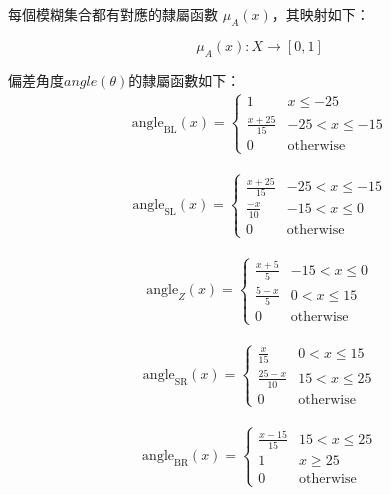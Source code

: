 \documentclass[12pt]{article}       %
\begin{document}
每個模糊集合都有對應的隸屬函數 $\mu_A(x)$，其映射如下：

\begin{equation}
    \mu_A(x) : X \rightarrow [0, 1]
\end{equation}


偏差角度$angle(\theta)$的隸屬函數如下：
\begin{align}
    \text{angle}_{\text{BL}}(x) = 
    \begin{cases}
    1 & x \le -25 \\
    \frac{x + 25}{15} & -25 < x \le -15 \\
    0 & \text{otherwise}
    \end{cases}    
\end{align}

\begin{align}
    \text{angle}_{\text{SL}}(x) = 
    \begin{cases}
    \frac{x + 25}{15} & -25 < x \le -15 \\
    \frac{-x}{10} & -15 < x \le 0 \\
    0 & \text{otherwise}
    \end{cases}    
\end{align}

\begin{align}
    \text{angle}_{Z}(x) = 
    \begin{cases}
    \frac{x + 5}{5} & -15 < x \le 0 \\
    \frac{5 - x}{5} & 0 < x \le 15 \\
    0 & \text{otherwise}
    \end{cases}    
\end{align}

\begin{align}
    \text{angle}_{\text{SR}}(x) = 
    \begin{cases}
    \frac{x}{15} & 0 < x \le 15 \\
    \frac{25 - x}{10} & 15 < x \le 25 \\
    0 & \text{otherwise}
    \end{cases}    
\end{align}

\begin{align}
    \text{angle}_{\text{BR}}(x) = 
    \begin{cases}
    \frac{x - 15}{15} & 15 < x \le 25 \\
    1 & x \ge 25 \\
    0 & \text{otherwise}
    \end{cases}    
\end{align}
\end{document}
